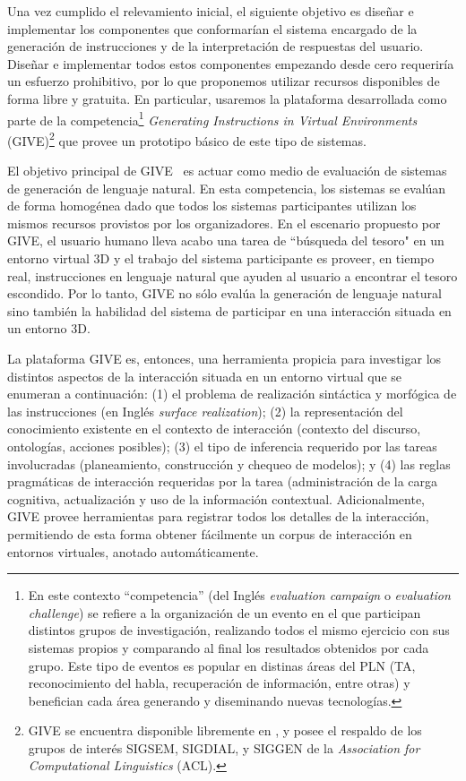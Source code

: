 Una vez cumplido el relevamiento inicial, el siguiente objetivo es
dise\~nar e implementar los componentes que
conformar\'ian el sistema encargado de la generaci\'on de instrucciones
y de la interpretaci\'on de respuestas del usuario.
Dise\~nar e implementar todos estos componentes empezando desde cero
requerir\'ia un esfuerzo prohibitivo, por lo que proponemos utilizar recursos
disponibles de forma libre y gratuita. En particular, usaremos la plataforma
desarrollada como parte de la competencia\footnote{En este contexto
``competencia'' (del Ingl\'es \emph{evaluation campaign} o \emph{evaluation challenge})
se refiere a la organizaci\'on de un evento en el que participan distintos
grupos de investigaci\'on, realizando todos el mismo ejercicio con sus sistemas
propios y comparando al final los resultados obtenidos por cada grupo. Este tipo
de eventos es popular en distinas \'areas del PLN (TA, reconocimiento del
habla, recuperaci\'on de informaci\'on, entre otras) y benefician
cada \'area generando y diseminando nuevas
tecnolog\'ias.} \textit{Generating Instructions in Virtual Environments}
(GIVE)\footnote{GIVE se encuentra disponible libremente en 
, y posee el respaldo de los grupos de
inter\'es SIGSEM, SIGDIAL, y SIGGEN de la \emph{Association for Computational
Linguistics} (ACL).} que
provee un prototipo b\'asico de este tipo de sistemas.

El objetivo principal de GIVE~\citep{byron09} es actuar como medio de
evaluaci\'on de sistemas de generaci\'on
de lenguaje natural. En esta competencia, los sistemas se eval\'uan de forma 
homog\'enea dado que todos los sistemas participantes utilizan los mismos
recursos provistos por los organizadores.   
En el escenario propuesto por GIVE, el usuario
humano lleva acabo una tarea de ``b\'usqueda del tesoro" en un entorno
virtual 3D y el trabajo del sistema participante es proveer, en tiempo
real, instrucciones en lenguaje natural que ayuden al usuario
a encontrar el tesoro escondido.  Por lo tanto, GIVE no s\'olo eval\'ua
la generaci\'on de lenguaje natural sino tambi\'en la habilidad del 
sistema de participar en una interacci\'on situada en un entorno 3D. 

La plataforma GIVE es, entonces, una herramienta propicia para
investigar los distintos aspectos de la interacci\'on situada en un entorno 
virtual que se enumeran a continuaci\'on: (1) el problema de realizaci\'on 
sint\'actica y morf\'ogica de las
instrucciones (en Ingl\'es \emph{surface realization});
(2) la representaci\'on del conocimiento existente en el contexto de
interacci\'on (contexto del discurso, ontolog\'ias, acciones posibles); (3)
el tipo de inferencia requerido por las tareas involucradas
(planeamiento, construcci\'on y chequeo de modelos); y (4)
las reglas pragm\'aticas de interacci\'on requeridas por la tarea
(administraci\'on de la carga cognitiva, actualizaci\'on y uso de la
informaci\'on contextual. Adicionalmente, GIVE provee 
herramientas para registrar todos los detalles de la
interacci\'on, permitiendo de esta forma obtener f\'acilmente un corpus de
interacci\'on en entornos virtuales, anotado autom\'aticamente. 


